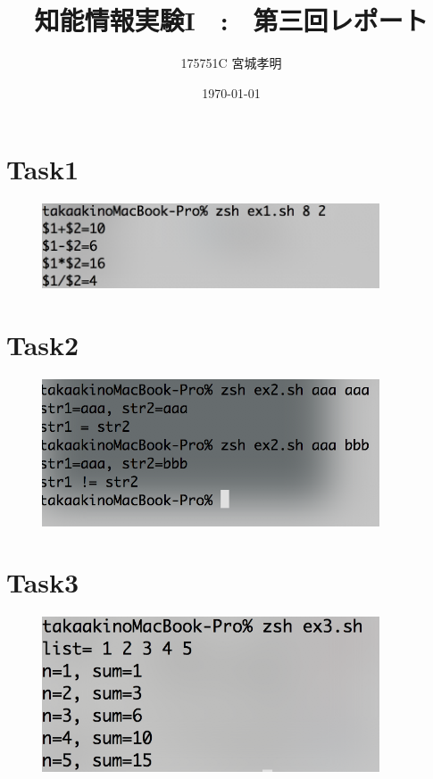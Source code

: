 \documentclass[a4paper,11pt,titlepage]{jarticle}
\title{知能情報実験I　:　第三回レポート}
\author{175751C 宮城孝明}
\date{\today}
\begin{document}
\maketitle
\tableofcontents
\clearpage

\section{Task1}

\begin{figure}[htbp]
	\centering
	\includegraphics[width=100mm]{task3_1.png}
	\label{task3_1}\\
\end{figure}

\section{Task2}

\begin{figure}[htbp]
	\centering
	\includegraphics[width=100mm]{task3_2.png}
	\label{task3_2}\\
\end{figure}

\section{Task3}

\begin{figure}[htbp]
	\centering
	\includegraphics[width=100mm]{task3_3.png}
	\label{task3_3}\\
\end{figure}
\end{document}
